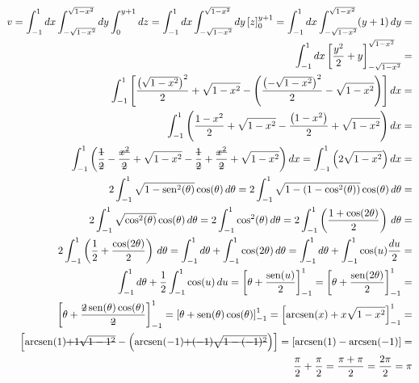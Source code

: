 \begin{enumerate}
	\begin{align*}
		v = \int_{-1}^1 dx \int_{-\sqrt{1 - x^2}}^{\sqrt{1 - x^2}} dy \int_0^{y + 1} dz = \int_{-1}^1 dx \int_{-\sqrt{1 - x^2}}^{\sqrt{1 - x^2}} dy \left[z\right]_0^{y + 1} = \int_{-1}^1 dx \int_{-\sqrt{1 - x^2}}^{\sqrt{1 - x^2}} (y + 1)\, dy =\\ \int_{-1}^1 dx \left[\dfrac{y^2}{2} + y\right]_{-\sqrt{1 - x^2}}^{\sqrt{1 - x^2}} =\\ \int_{-1}^1 \left[\dfrac{\left(\sqrt{1 - x^2}\right)^2}{2} + \sqrt{1 - x^2} - \left(\dfrac{\left(-\sqrt{1 - x^2}\right)^2}{2} - \sqrt{1 - x^2}\right)\right] dx =\\ \int_{-1}^1 \left(\dfrac{1 - x^2}{2} + \sqrt{1 - x^2} - \dfrac{\left(1 - x^2\right)}{2} + \sqrt{1 - x^2}\right) dx =\\ \int_{-1}^1 \left(\dfrac{\overstrike{1}}{\overstrike{2}} - \dfrac{\overstrike{x^2}}{\overstrike{2}} + \sqrt{1 - x^2} - \dfrac{\overstrike{1}}{\overstrike{2}} + \dfrac{\overstrike{x^2}}{\overstrike{2}} + \sqrt{1 - x^2}\right) dx = \int_{-1}^1 \left(2\sqrt{1 - x^2}\right) dx =\\ 2\int_{-1}^1 \sqrt{1 - \sen^2(\theta)} \cos(\theta)\, d\theta = 2\int_{-1}^1 \sqrt{1 - \left(1 - \cos^2(\theta)\right)} \cos(\theta)\, d\theta =\\ 2\int_{-1}^1 \sqrt{ \cos^2(\theta)} \cos(\theta)\, d\theta = 2\int_{-1}^1 \cos^2(\theta)\, d\theta =  2\int_{-1}^1 \left(\dfrac{1 + \cos(2\theta)}{2}\right)\, d\theta =\\ 2\int_{-1}^1 \left(\dfrac{1}{2} + \dfrac{\cos(2\theta)}{2}\right)\, d\theta = \int_{-1}^1 d\theta + \int_{-1}^1 \cos(2\theta)\, d\theta = \int_{-1}^1 d\theta + \int_{-1}^1 \cos(u)\dfrac{du}{2} =\\ \int_{-1}^1 d\theta + \dfrac{1}{2}\int_{-1}^1 \cos(u)\, du = \left[\theta + \dfrac{\sen(u)}{2}\right]_{-1}^1 = \left[\theta + \dfrac{\sen(2\theta)}{2}\right]_{-1}^1 =\\ \left[\theta + \dfrac{\overstrike{2}\sen(\theta)\cos(\theta)}{\overstrike{2}}\right]_{-1}^1 = \left[\theta + \sen(\theta)\cos(\theta)\right]_{-1}^1 = \left[\arcsen(x) + x\sqrt{1 - x^2}\right]_{-1}^1 =\\ \left[\arcsen(1) \overstrike{+ 1\sqrt{1 - 1^2}} - \left(\arcsen(-1) \overstrike{+ (-1)\sqrt{1 - (-1)^2}}\right)\right] = \left[\arcsen(1) - \arcsen(-1)\right] =\\ \dfrac{\pi}{2} + \dfrac{\pi}{2} = \dfrac{\pi + \pi}{2} = \dfrac{2\pi}{2} = \pi
	\end{align*}
	\begin{equation*}

\end{equation*}
\end{enumerate}

